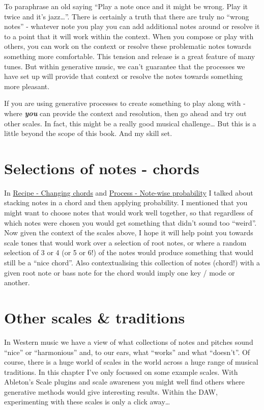 \documentclass[
  12pt,
  letterpaper,
  oneside,
  open=any]{scrbook}
\begin{document}
To paraphrase an old saying ``Play a note once and it might be wrong.
Play it twice and it's jazz\ldots{}''. There is certainly a truth that
there are truly no ``wrong notes'' - whatever note you play you can add
additional notes around or resolve it to a point that it will work
within the context. When you compose or play with others, you can work
on the context or resolve these problematic notes towards something more
comfortable. This tension and release is a great feature of many tunes.
But within generative music, we can't guarantee that the processes we
have set up will provide that context or resolve the notes towards
something more pleasant.

If you are using generative processes to create something to play along
with - where \textbf{\emph{you}} can provide the context and resolution,
then go ahead and try out other scales. In fact, this might be a really
good musical challenge\ldots{} But this is a little beyond the scope of
this book. And my skill set.

\section{Selections of notes -
chords}\label{selections-of-notes---chords}

In \hyperref[Chapter-001-Recipe-Changing_Chords]{Recipe - Changing
chords} and \hyperref[Chapter-002-Process-Note_wise_probability]{Process
- Note-wise probability} I talked about stacking notes in a chord and
then applying probability. I mentioned that you might want to choose
notes that would work well together, so that regardless of which notes
were chosen you would get something that didn't sound too ``weird''. Now
given the context of the scales above, I hope it will help point you
towards scale tones that would work over a selection of root notes, or
where a random selection of 3 or 4 (or 5 or 6!) of the notes would
produce something that would still be a ``nice chord''. Also
contextualising this collection of notes (chord!) with a given root note
or bass note for the chord would imply one key / mode or another.

\section{Other scales \& traditions}\label{other-scales-traditions}

In Western music we have a view of what collections of notes and pitches
sound ``nice'' or ``harmonious'' and, to our ears, what ``works'' and
what ``doesn't''. Of course, there is a huge world of scales in the
world across a huge range of musical traditions. In this chapter I've
only focussed on some example scales. With Ableton's Scale plugins and
scale awareness you might well find others where generative methods
would give interesting results. Within the DAW, experimenting with these
scales is only a click away\ldots{}
\end{document}
